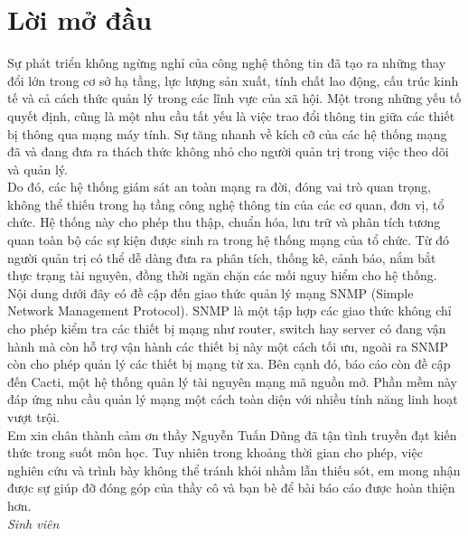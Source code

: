 \documentclass[12pt,oneside,a4paper]{article}
\begin{document}
	\setlength{\parindent}{0pt}

	\newpage
	\tableofcontents
	\newpage
	

\section*{Lời mở đầu}
%
Sự phát triển không ngừng nghỉ của công nghệ thông tin đã tạo ra những thay đổi lớn trong cơ sở hạ tầng, lực lượng sản xuất, tính chất lao động, cấu trúc kinh tế và cả cách thức quản lý trong các lĩnh vực của xã hội. Một trong những yếu tố quyết định, cũng là một nhu cầu tất yếu là việc trao đổi thông tin giữa các thiết bị thông qua mạng máy tính. Sự tăng nhanh về kích cỡ của các hệ thống mạng đã và đang đưa ra thách thức không nhỏ cho người quản trị trong việc theo dõi và quản lý.\\

Do đó, các hệ thống giám sát an toàn mạng ra đời, đóng vai trò quan trọng, không thể thiếu trong hạ tầng công nghệ thông tin của các cơ quan, đơn vị, tổ chức. Hệ thống này cho phép thu thập, chuẩn hóa, lưu trữ và phân tích tương quan toàn bộ các sự kiện được sinh ra trong hệ thống mạng của tổ chức. Từ đó người quản trị có thể dễ dàng đưa ra phân tích, thống kê, cảnh báo, nắm bắt thực trạng tài nguyên, đồng thời ngăn chặn các mối nguy hiểm cho hệ thống.\\

Nội dung dưới đây có đề cập đến giao thức quản lý mạng SNMP (Simple Network Management Protocol). SNMP là một tập hợp các giao thức không chỉ cho phép kiểm tra các thiết bị mạng như router, switch hay server có đang vận hành mà còn hỗ trợ vận hành các thiết bị này một cách tối ưu, ngoài ra SNMP còn cho phép quản lý các thiết bị mạng từ xa. Bên cạnh đó, báo cáo còn đề cập đến Cacti, một hệ thống quản lý tài nguyên mạng mã nguồn mở. Phần mềm này đáp ứng nhu cầu quản lý mạng một cách toàn diện với nhiều tính năng linh hoạt vượt trội.\\

Em xin chân thành cảm ơn thầy Nguyễn Tuấn Dũng đã tận tình truyền đạt kiến thức trong suốt môn học. Tuy nhiên trong khoảng thời gian cho phép, việc nghiên cứu và trình bày không thể tránh khỏi nhầm lẫn thiếu sót, em mong nhận được sự giúp đỡ đóng góp của thầy cô và bạn bè để bài báo cáo được hoàn thiện hơn.\\

\textit{Sinh viên}\\
\end{document}
